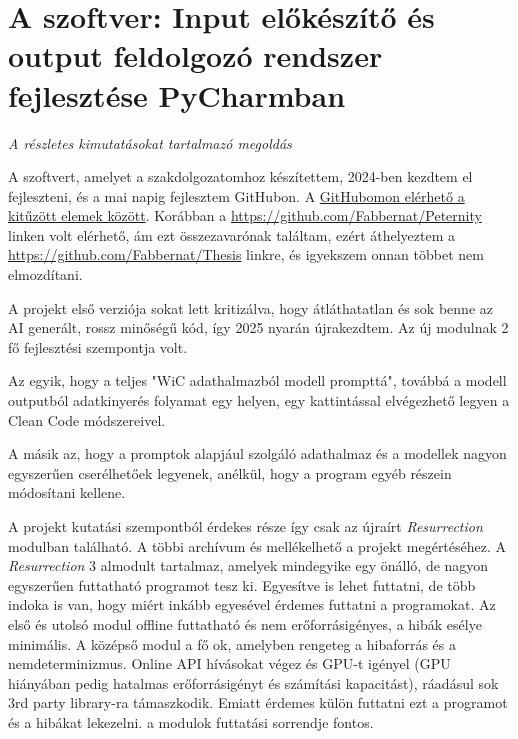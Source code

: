 \documentclass[12pt]{report}
\theoremstyle{definition}
\begin{document}
\newcommand{\chapterwithdesc}[2]{%
  \chapter{#1}%
  \vspace{-1ex}%
  {\large\itshape #2\par}%
  \vspace{2ex}%
}
\chapterwithdesc
  {A szoftver: Input előkészítő és output feldolgozó rendszer fejlesztése PyCharmban}
  {A részletes kimutatásokat tartalmazó megoldás}
\label{chap:resurrection}

A szoftvert, amelyet a szakdolgozatomhoz készítettem, 2024-ben kezdtem el fejleszteni, és a mai napig fejlesztem GitHubon. A \href{https://github.com/Fabbernat}{GitHubomon elérhető a kitűzött elemek között}. Korábban a \href{https://github.com/Fabbernat/Peternity}{https://github.com/Fabbernat/Peternity} linken volt elérhető, ám ezt összezavarónak találtam, ezért áthelyeztem a \href{https://github.com/Fabbernat/Thesis} {https://github.com/Fabbernat/Thesis} linkre, és igyekszem onnan többet nem elmozdítani.

A projekt első verziója sokat lett kritizálva, hogy átláthatatlan és sok benne az AI generált, rossz minőségű kód, így 2025 nyarán újrakezdtem. Az új modulnak 2 fő fejlesztési szempontja volt.

Az egyik, hogy a teljes "WiC adathalmazból modell prompttá", továbbá a modell outputból adatkinyerés %
folyamat egy helyen, egy kattintással elvégezhető legyen a Clean Code módszereivel.

A másik az, hogy a promptok alapjául szolgáló adathalmaz és a modellek nagyon egyszerűen cserélhetőek legyenek, anélkül, hogy a program egyéb részein módosítani kellene.


A projekt kutatási szempontból érdekes része így csak az újraírt \textit{Resurrection} modulban található. A többi archívum és mellékelhető a projekt megértéséhez. A \textit{Resurrection} 3 almodult tartalmaz, amelyek mindegyike egy önálló, de nagyon egyszerűen futtatható programot tesz ki. Egyesítve is lehet futtatni, de több indoka is van, hogy miért inkább egyesével érdemes futtatni a programokat. Az első és utolsó modul offline futtatható és nem erőforrásigényes, a hibák esélye minimális. A középső modul a fő ok, amelyben rengeteg a hibaforrás és a nemdeterminizmus. Online API hívásokat végez és GPU-t igényel (GPU hiányában pedig hatalmas erőforrásigényt és számítási kapacitást), ráadásul sok 3rd party library-ra támaszkodik. Emiatt érdemes külön futtatni ezt a programot és a hibákat lekezelni. a modulok futtatási sorrendje fontos.
\end{document}
